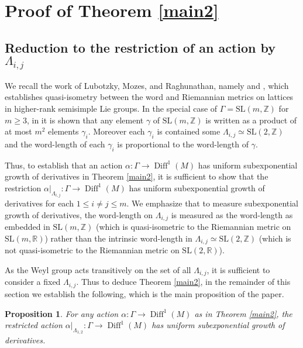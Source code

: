 \documentclass[10pt,reqno]{amsart}
\theoremstyle{Theorem}
\newtheorem{proposition}[theorem]{Proposition}
\theoremstyle{definition}
\theoremstyle{remark}
\newcommand{\restrict}[2]{{#1}{|_{{ #2}}}}
\DeclareMathOperator{\Diff}{Diff}
\newcommand{\R}{\mathbb {R}}
\newcommand{\Z}{\mathbb {Z}}
\newcommand{\Sl}{\mathrm{SL}}
\begin{document}
\section{Proof of Theorem \ref{main2}}
\subsection{Reduction to the restriction of an action by $\Lambda_{i,j}$}
We recall the work of Lubotzky, Mozes, and Raghunathan, namely   \cite{MR1244421} and \cite{MR1828742}, which establishes quasi-isometry   between the word and Riemannian metrics on lattices in higher-rank semisimple Lie groups.
In the special case of $\Gamma= \Sl(m,\Z)$ for $m\ge 3$,
 in  \cite[Corollary 3]{MR1244421} it is shown that any element $\gamma$ of $\Sl(m,\Z)$ is written as a product of at most $m^2$ elements $\gamma_i$.  Moreover each $\gamma_i$ is contained some $\Lambda_{i,j}\simeq \Sl(2,\Z)$ and the word-length of each $\gamma_i$ is  proportional to the word-length of $\gamma$.

 Thus, to establish that an action $\alpha\colon \Gamma\to \Diff^1(M)$ has uniform subexponential growth of derivatives in  Theorem \ref{main2}, it  is sufficient to show that the restriction  $\restrict {\alpha}{\Lambda_{i,j}}\colon \Gamma\to \Diff^1(M)$ has uniform subexponential growth of derivatives for each $1\le i\neq j \le m$.  We emphasize that to measure subexponential growth of derivatives, the word-length on ${\Lambda_{i,j}}$ is measured as the word-length as embedded in $\Sl(m,\Z)$ (which is quasi-isometric to the Riemannian metric on $\Sl(m,\R)$) rather than the intrinsic word-length in $\Lambda_{i,j}\simeq \Sl(2,\Z)$ (which is not quasi-isometric to the Riemannian metric on $\Sl(2,\R)$).

As the Weyl group acts transitively on the set of all $\Lambda_{i,j}$, it is   sufficient to consider a fixed $\Lambda_{i,j}$.  Thus to deduce Theorem \ref{main2},  in the remainder of this section we establish the following, which is the  main proposition of the paper.
\begin{proposition}\label{prop:maybeweshouldstatethemainresultatsomepoint}
For any action $\alpha\colon \Gamma\to \Diff^1(M)$ as in  Theorem \ref{main2},  the restricted action $\restrict {\alpha}{\Lambda_{1,2}}\colon \Gamma\to \Diff^1(M)$ has  uniform subexponential growth of derivatives.
\end{proposition}
\end{document}
